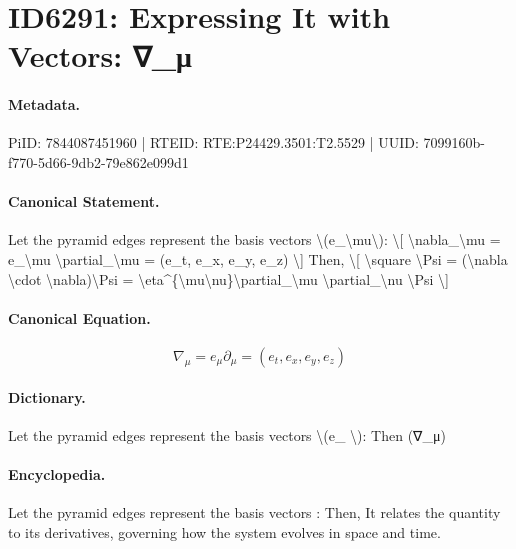 \section*{ID6291: Expressing It with Vectors: ∇\_μ}
\paragraph{Metadata.}
PiID: 7844087451960 | RTEID: RTE:P24429.3501:T2.5529 | UUID: 7099160b-f770-5d66-9db2-79e862e099d1

\paragraph{Canonical Statement.}
Let the pyramid edges represent the basis vectors \textbackslash{}(e\_\textbackslash{}mu\textbackslash{}): \textbackslash{}[ \textbackslash{}nabla\_\textbackslash{}mu = e\_\textbackslash{}mu \textbackslash{}partial\_\textbackslash{}mu = (e\_t, e\_x, e\_y, e\_z) \textbackslash{}] Then, \textbackslash{}[ \textbackslash{}square \textbackslash{}Psi = (\textbackslash{}nabla \textbackslash{}cdot \textbackslash{}nabla)\textbackslash{}Psi = \textbackslash{}eta\textasciicircum{}\{\textbackslash{}mu\textbackslash{}nu\}\textbackslash{}partial\_\textbackslash{}mu \textbackslash{}partial\_\textbackslash{}nu \textbackslash{}Psi \textbackslash{}]

\paragraph{Canonical Equation.}
\[
\nabla_\mu = e_\mu \partial_\mu = (e_t, e_x, e_y, e_z)
\]

\paragraph{Dictionary.}
Let the pyramid edges represent the basis vectors \textbackslash{}(e\_ \textbackslash{}): Then (∇\_μ)

\paragraph{Encyclopedia.}
Let the pyramid edges represent the basis vectors : Then, It relates the quantity to its derivatives, governing how the system evolves in space and time.
